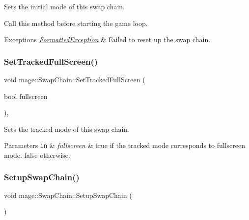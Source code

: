 Sets the initial mode of this swap chain.

Call this method before starting the game loop.


\begin{DoxyExceptions}{Exceptions}
{\em \hyperlink{classmage_1_1_formatted_exception}{Formatted\+Exception}} & Failed to reset up the swap chain. \\
\hline
\end{DoxyExceptions}
\hypertarget{classmage_1_1_swap_chain_ae2689c07632f1fdc8367c9eefd62851b}{}\label{classmage_1_1_swap_chain_ae2689c07632f1fdc8367c9eefd62851b} 
\subsubsection{\texorpdfstring{Set\+Tracked\+Full\+Screen()}{SetTrackedFullScreen()}}
{\footnotesize\ttfamily void mage\+::\+Swap\+Chain\+::\+Set\+Tracked\+Full\+Screen (\begin{DoxyParamCaption}\item[{bool}]{fullscreen }\end{DoxyParamCaption})\hspace{0.3cm}{\ttfamily [private]}, {\ttfamily [noexcept]}}

Sets the tracked mode of this swap chain.


\begin{DoxyParams}[1]{Parameters}
\mbox{\tt in}  & {\em fullscreen} & {\ttfamily true} if the tracked mode corresponds to fullscreen mode. {\ttfamily false} otherwise. \\
\hline
\end{DoxyParams}
\hypertarget{classmage_1_1_swap_chain_aec2b14bc569046174f6a416a7f20c8d5}{}\label{classmage_1_1_swap_chain_aec2b14bc569046174f6a416a7f20c8d5} 
\subsubsection{\texorpdfstring{Setup\+Swap\+Chain()}{SetupSwapChain()}}
{\footnotesize\ttfamily void mage\+::\+Swap\+Chain\+::\+Setup\+Swap\+Chain (\begin{DoxyParamCaption}{ }\end{DoxyParamCaption})\hspace{0.3cm}{\ttfamily [private]}}

